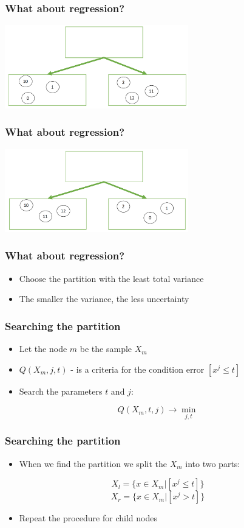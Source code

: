 \documentclass[default]{beamer}
\begin{document}
	\begin{frame}
		\frametitle{What about regression?}
		\centering
		\includegraphics[width=0.6\textwidth]{trees25.png}
	\end{frame}

	\begin{frame}
		\frametitle{What about regression?}
		\centering
		\includegraphics[width=0.6\textwidth]{trees26.png}
	\end{frame}

	\begin{frame}
		\frametitle{What about regression?}
		\Large
		\begin{itemize}
			\item Choose the partition with the least total variance
			\item The smaller the variance, the less uncertainty
		\end{itemize}
	\end{frame}

	\begin{frame}
		\frametitle{Searching the partition}
		\Large
		\begin{itemize}
			\item Let the node $m$ be the sample $X_m$
			\item $Q(X_m,j,t)$ - is a criteria for the condition error  $[x^j \le t]$
			\item Search the parameters $t$ and $j$:
		\end{itemize}
	
		\[
			Q(X_m,t,j)\rightarrow \min_{j,t}
		\]
	\end{frame}

	\begin{frame}
		\frametitle{Searching the partition}
		\Large
		\begin{itemize}
			\item When we find the partition we split the $X_m$ into two parts:
		\end{itemize}
		
		\[
		X_l=\{x\in X_m | [x^j \le t]\}
		\]
		\[
		X_r=\{x\in X_m | [x^j > t]\}
		\]
		\begin{itemize}
			\item Repeat the procedure for child nodes
		\end{itemize}
	\end{frame}
\end{document}
